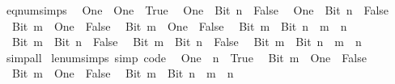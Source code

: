 \begin{isabellebody}
\isanewline
%
\endisadelimproof
\isanewline
{}\isamarkupfalse%
\ eq{\isacharunderscore}{\kern0pt}num{\isacharunderscore}{\kern0pt}simps{\isacharcolon}{\kern0pt}\isanewline
\ \ {\isachardoublequoteopen}One\ {\isacharequal}{\kern0pt}\ One\ {\isasymlongleftrightarrow}\ True{\isachardoublequoteclose}\isanewline
\ \ {\isachardoublequoteopen}One\ {\isacharequal}{\kern0pt}\ Bit{}\ n\ {\isasymlongleftrightarrow}\ False{\isachardoublequoteclose}\isanewline
\ \ {\isachardoublequoteopen}One\ {\isacharequal}{\kern0pt}\ Bit{}\ n\ {\isasymlongleftrightarrow}\ False{\isachardoublequoteclose}\isanewline
\ \ {\isachardoublequoteopen}Bit{}\ m\ {\isacharequal}{\kern0pt}\ One\ {\isasymlongleftrightarrow}\ False{\isachardoublequoteclose}\isanewline
\ \ {\isachardoublequoteopen}Bit{}\ m\ {\isacharequal}{\kern0pt}\ One\ {\isasymlongleftrightarrow}\ False{\isachardoublequoteclose}\isanewline
\ \ {\isachardoublequoteopen}Bit{}\ m\ {\isacharequal}{\kern0pt}\ Bit{}\ n\ {\isasymlongleftrightarrow}\ m\ {\isacharequal}{\kern0pt}\ n{\isachardoublequoteclose}\isanewline
\ \ {\isachardoublequoteopen}Bit{}\ m\ {\isacharequal}{\kern0pt}\ Bit{}\ n\ {\isasymlongleftrightarrow}\ False{\isachardoublequoteclose}\isanewline
\ \ {\isachardoublequoteopen}Bit{}\ m\ {\isacharequal}{\kern0pt}\ Bit{}\ n\ {\isasymlongleftrightarrow}\ False{\isachardoublequoteclose}\isanewline
\ \ {\isachardoublequoteopen}Bit{}\ m\ {\isacharequal}{\kern0pt}\ Bit{}\ n\ {\isasymlongleftrightarrow}\ m\ {\isacharequal}{\kern0pt}\ n{\isachardoublequoteclose}\isanewline
%
\isadelimproof
\ \ %
\endisadelimproof
%
\isatagproof
{}\isamarkupfalse%
\ simp{\isacharunderscore}{\kern0pt}all%
\endisatagproof
{\isafoldproof}%
%
\isadelimproof
\isanewline
%
\endisadelimproof
\isanewline
{}\isamarkupfalse%
\ le{\isacharunderscore}{\kern0pt}num{\isacharunderscore}{\kern0pt}simps\ {\isacharbrackleft}{\kern0pt}simp{\isacharcomma}{\kern0pt}\ code{\isacharbrackright}{\kern0pt}{\isacharcolon}{\kern0pt}\isanewline
\ \ {\isachardoublequoteopen}One\ {\isasymle}\ n\ {\isasymlongleftrightarrow}\ True{\isachardoublequoteclose}\isanewline
\ \ {\isachardoublequoteopen}Bit{}\ m\ {\isasymle}\ One\ {\isasymlongleftrightarrow}\ False{\isachardoublequoteclose}\isanewline
\ \ {\isachardoublequoteopen}Bit{}\ m\ {\isasymle}\ One\ {\isasymlongleftrightarrow}\ False{\isachardoublequoteclose}\isanewline
\ \ {\isachardoublequoteopen}Bit{}\ m\ {\isasymle}\ Bit{}\ n\ {\isasymlongleftrightarrow}\ m\ {\isasymle}\ n{\isachardoublequoteclose}\isanewline

\end{isabellebody}
